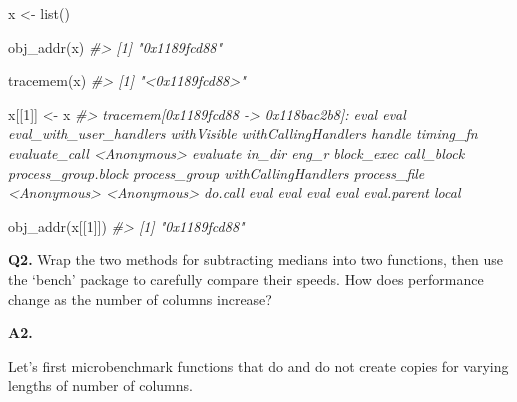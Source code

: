 \documentclass[
]{book}
\newenvironment{Shaded}{\begin{snugshade}}{\end{snugshade}}
\newcommand{\CommentTok}[1]{\textcolor[rgb]{0.56,0.35,0.01}{\textit{#1}}}
\newcommand{\DecValTok}[1]{\textcolor[rgb]{0.00,0.00,0.81}{#1}}
\newcommand{\FunctionTok}[1]{\textcolor[rgb]{0.00,0.00,0.00}{#1}}
\newcommand{\NormalTok}[1]{#1}
\newcommand{\OtherTok}[1]{\textcolor[rgb]{0.56,0.35,0.01}{#1}}
\begin{document}
\begin{Shaded}
\begin{Highlighting}[]
\NormalTok{x }\OtherTok{\textless{}{-}} \FunctionTok{list}\NormalTok{()}

\FunctionTok{obj\_addr}\NormalTok{(x)}
\CommentTok{\#\textgreater{} [1] "0x1189fcd88"}

\FunctionTok{tracemem}\NormalTok{(x)}
\CommentTok{\#\textgreater{} [1] "\textless{}0x1189fcd88\textgreater{}"}

\NormalTok{x[[}\DecValTok{1}\NormalTok{]] }\OtherTok{\textless{}{-}}\NormalTok{ x}
\CommentTok{\#\textgreater{} tracemem[0x1189fcd88 {-}\textgreater{} 0x118bac2b8]: eval eval eval\_with\_user\_handlers withVisible withCallingHandlers handle timing\_fn evaluate\_call \textless{}Anonymous\textgreater{} evaluate in\_dir eng\_r block\_exec call\_block process\_group.block process\_group withCallingHandlers process\_file \textless{}Anonymous\textgreater{} \textless{}Anonymous\textgreater{} do.call eval eval eval eval eval.parent local}

\FunctionTok{obj\_addr}\NormalTok{(x[[}\DecValTok{1}\NormalTok{]])}
\CommentTok{\#\textgreater{} [1] "0x1189fcd88"}
\end{Highlighting}
\end{Shaded}

\textbf{Q2.} Wrap the two methods for subtracting medians into two functions, then use the `bench' package to carefully compare their speeds. How does performance change as the number of columns increase?

\textbf{A2.}

Let's first microbenchmark functions that do and do not create copies for varying lengths of number of columns.
\end{document}

